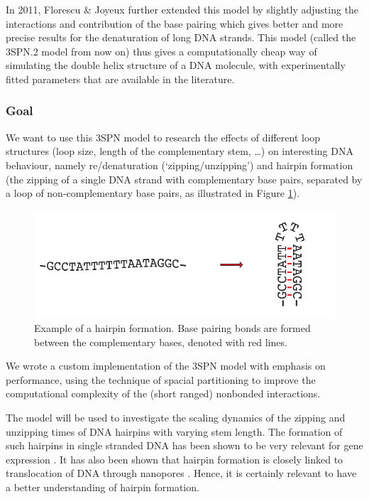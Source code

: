 In 2011, Florescu \& Joyeux \cite{florescu2011thermal} further extended this model by slightly adjusting the interactions and contribution of the base pairing which gives better and more precise results for the denaturation of long DNA strands. This model (called the 3SPN.2 model from now on) thus gives a computationally cheap way of simulating the double helix structure of a DNA molecule, with experimentally fitted parameters that are available in the literature.



\subsubsection*{Goal}

We want to use this 3SPN model to research the effects of different loop structures (loop size, length of the complementary stem, \ldots) on interesting DNA behaviour, namely re/denaturation (`zipping/unzipping') and hairpin formation (the zipping of a single DNA strand with complementary base pairs, separated by a loop of non-complementary base pairs, as illustrated in Figure \ref{hairpin_example}).
\begin{figure}[h]
\includegraphics{images/hairpin_example}
\caption{Example of a hairpin formation. Base pairing bonds are formed between the complementary bases, denoted with red lines.}\label{hairpin_example}
\end{figure}
We wrote a custom implementation of the 3SPN model with emphasis on performance, using the technique of spacial partitioning \cite{plimpton1995fast} to improve the computational complexity of the (short ranged) nonbonded interactions.

The model will be used to investigate the scaling dynamics of the zipping and unzipping times of DNA hairpins with varying stem length. The formation of such hairpins in single stranded DNA has been shown to be very relevant for gene expression \cite{oettinger2000hairpins}. It has also been shown that hairpin formation is closely linked to translocation of DNA through nanopores \cite{carlon2011anomalous}. Hence, it is certainly relevant to have a better understanding of hairpin formation.

